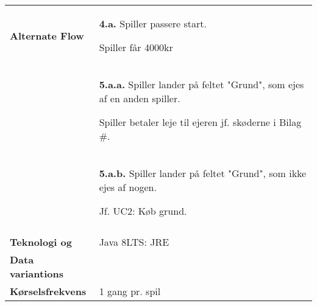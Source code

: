 \documentclass[class=article, crop=false]{standalone}
\begin{document}
\begin{table}[H]
\begin{tabularx}{\textwidth}{|l|X|}
            \textbf{Alternate Flow}   & \textbf{4.a.} Spiller passere start.
                                        \begin{enumerate} \begin{tabenum}
                                                \item Spiller får 4000kr
                                            \end{tabenum} \end{enumerate}
                                         \\
                                      & \textbf{5.a.a.} Spiller lander på feltet
                                        "Grund", som ejes af en anden spiller.
                                        \begin{enumerate} \begin{tabenum}
                                          \item Spiller betaler leje til ejeren
                                                jf. skøderne i Bilag \#.
                                        \end{tabenum} \end{enumerate}
                                        \\
                                    & \textbf{5.a.b.} Spiller lander på feltet
                                        "Grund", som ikke ejes af nogen.
                                    \begin{enumerate} \begin{tabenum}
                                                          \item Jf. UC2: Køb grund.
                                    \end{tabenum} \end{enumerate}
                                    \\


                                        \\



            \hline








            \textbf{Teknologi og}     & Java 8LTS: JRE \\
            \textbf{Data variantions} &  \\ \hline
            \textbf{Kørselsfrekvens} & 1 gang pr. spil\\ \hline
        \end{tabularx}


    \end{table}
\end{document}
